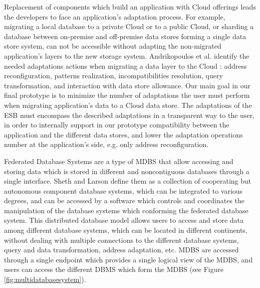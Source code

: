 Replacement of components which build an application with Cloud offerings leads the developers to face an application's adaptation process. For example, migrating a local database to a private Cloud or to a public Cloud, or sharding a database between on-premise and off-premise data stores forming a single data store system, can not be accessible without adapting the non-migrated application's layers to the new storage system. Andrikopoulos et al. identify the needed adaptations actions when migrating a data layer to the Cloud \cite{andrikopoulos2013}: address reconfiguration, patterns realization, incompatibilities resolution, query transformation, and interaction with data store allowance. Our main goal in our final prototype is to minimize the number of adaptations the user must perform when migrating application's data to a Cloud data store. The adaptations of the \ac{ESB} must encompass the described adaptations in a transparent way to the user, in order to internally support in our prototype compatibility between the application and the different data stores, and lower the adaptation operations number at the application's side, e.g. only address reconfiguration. 

Federated Database Systems are a type of \ac{MDBS} that allow accessing and storing data which is stored in different and noncontiguous databases through a single interface. Sheth and Larson define them as a collection of cooperating but autonomous component database systems, which can be integrated to various degrees, and can be accessed by a software which controls and coordinates the manipulation of the database systems which conforming the federated database system. This distributed database model allows users to access and store data among different database systems, which can be located in different continents, without dealing with multiple connections to the different database systems, query and data transformation, address adaptation, etc. \ac{MDBS} are accessed through a single endpoint which provides a single logical view of the \ac{MDBS}, and users can access the different \ac{DBMS} which form the \ac{MDBS} (see Figure \ref{fig:multidatabasesystem}). 

